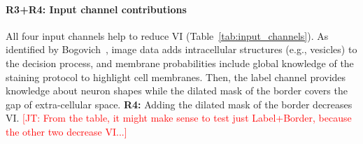 \documentclass[10pt,twocolumn,letterpaper]{article}
\newcommand{\JT}[1]{\textcolor{red}{[JT: #1]}}
\begin{document}
\paragraph{R3+R4: Input channel contributions} All four input channels help to reduce VI (Table~\ref{tab:input_channels}). As identified by Bogovich~\etal, image data adds intracellular structures (e.g., vesicles) to the decision process, and membrane probabilities include global knowledge of the staining protocol to highlight cell membranes. Then, the label channel provides knowledge about neuron shapes while the dilated mask of the border covers the gap of extra-cellular space. \newline \noindent \textbf{R4:} Adding the dilated mask of the border decreases VI. \JT{From the table, it might make sense to test just Label+Border, because the other two decrease VI...}

\begin{table}[h]
\caption{Automatic selection on the AC4 subvolume ($p_t=0.95$) using our GP classifier; median VI reduction. The combination of all four input channels performs best.}
\vspace{-0.5cm}
\label{tab:input_channels}
\end{table}

\end{document}
